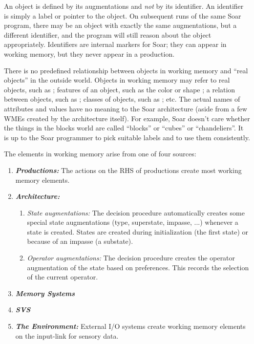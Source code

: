 An object is defined by its augmentations and \emph{not} by its identifier. An identifier is simply a label or pointer to the object. On subsequent runs of the same Soar program, there may be an object with exactly the same augmentations, but a different identifier, and the program will still reason about the object appropriately. Identifiers are internal markers for Soar; they can appear in working memory, but they never appear in a production.

There is no predefined relationship between objects in working memory and ``real objects'' in the outside world.  Objects in working memory may refer to real objects, such as ; features of an object, such as the color  or shape ; a relation between objects, such as ; classes of objects, such as ; etc. The actual names of attributes and values have no meaning to the Soar architecture (aside from a few WMEs created by the architecture itself). For example, Soar doesn't care whether the things in the blocks world are called ``blocks'' or ``cubes'' or ``chandeliers''. It is up to the Soar programmer to pick suitable labels and to use them consistently.

The elements in working memory arise from one of four sources:

\vspace{-12pt}
\begin{enumerate}
	\item \textbf{\textit{Productions:}}
		The actions on the RHS of productions create most working memory elements.
	\vspace{-8pt}
	\item \textbf{\textit{Architecture:}}
	\vspace{-8pt}
	\begin{enumerate}
		\item \textit{State augmentations:}
			The decision procedure automatically creates some special state augmentations (type, superstate, impasse, ...) whenever a state is created.  States are created during initialization (the first state) or because of an impasse (a substate).
		\vspace{-4pt}
		\item \textit{Operator augmentations:}
			The decision procedure creates the operator augmentation of the state based on preferences. This records the selection of the current operator.
		\vspace{-8pt}
	\end{enumerate}
	\item \textbf{\textit{Memory Systems}}
	\vspace{-8pt}
	\item \textbf{\textit{SVS}}
	\vspace{-8pt}
	\item \textbf{\textit{The Environment:}}
		External I/O systems create working memory elements on the input-link for sensory data.
	\vspace{-8pt}
\end{enumerate}

